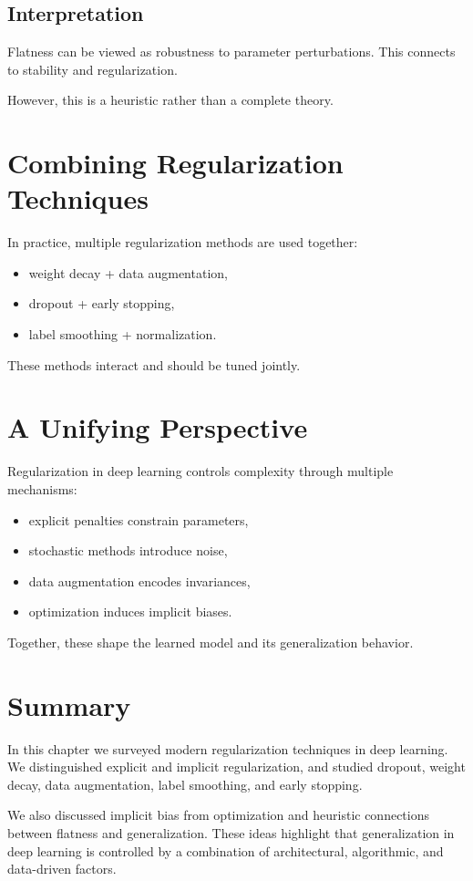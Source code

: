 \subsection{Interpretation}

Flatness can be viewed as robustness to parameter perturbations. This connects to stability and regularization.

However, this is a heuristic rather than a complete theory.

\section{Combining Regularization Techniques}

In practice, multiple regularization methods are used together:
\begin{itemize}
    \item weight decay + data augmentation,
    \item dropout + early stopping,
    \item label smoothing + normalization.
\end{itemize}

These methods interact and should be tuned jointly.

\section{A Unifying Perspective}

Regularization in deep learning controls complexity through multiple mechanisms:
\begin{itemize}
    \item explicit penalties constrain parameters,
    \item stochastic methods introduce noise,
    \item data augmentation encodes invariances,
    \item optimization induces implicit biases.
\end{itemize}

Together, these shape the learned model and its generalization behavior.

\section{Summary}

In this chapter we surveyed modern regularization techniques in deep learning. We distinguished explicit and implicit regularization, and studied dropout, weight decay, data augmentation, label smoothing, and early stopping.

We also discussed implicit bias from optimization and heuristic connections between flatness and generalization. These ideas highlight that generalization in deep learning is controlled by a combination of architectural, algorithmic, and data-driven factors.